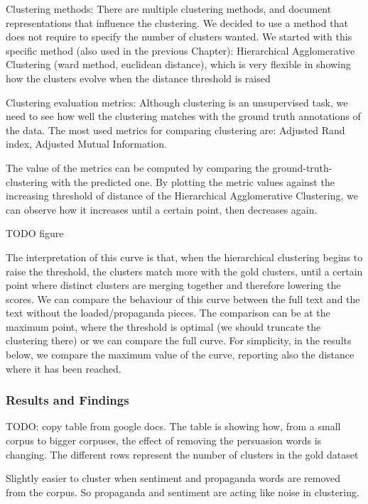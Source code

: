 Clustering methods:
There are multiple clustering methods, and document representations that influence the clustering. We decided to use a method that does not require to specify the number of clusters wanted.
We started with this specific method (also used in the previous Chapter):
Hierarchical Agglomerative Clustering (ward method, euclidean distance), which  is very flexible in showing how the clusters evolve when the distance threshold is raised


Clustering evaluation metrics:
Although clustering is an unsupervised task, we need to see how well the clustering matches with the ground truth annotations of the data. 
The most used metrics for comparing clustering are:
Adjusted Rand index,
Adjusted Mutual Information.

The value of the metrics can be computed by comparing the ground-truth-clustering with the predicted one.
By plotting the metric values against the increasing threshold of distance of the Hierarchical Agglomerative Clustering, we can observe how it increases until a certain point, then decreases again.

TODO figure

The interpretation of this curve is that, when the hierarchical clustering begins to raise the threshold, the clusters match more with the gold clusters, until a certain point where distinct clusters are merging together and therefore lowering the scores.
We can compare the behaviour of this curve between the full text and the text without the loaded/propaganda pieces. The comparison can be at the maximum point, where the threshold is optimal (we should truncate the clustering there) or we can compare the full curve. For simplicity, in the results below, we compare the maximum value of the curve, reporting also the distance where it has been reached.


\subsubsection{Results and Findings}

TODO: copy table from google docs.
The table is showing how, from a small corpus to bigger corpuses, the effect of removing the persuasion words is changing.
The different rows represent the number of clusters in the gold dataset 

Slightly easier to cluster when sentiment and propaganda words are removed from the corpus.
So propaganda and sentiment are acting like noise in clustering.

